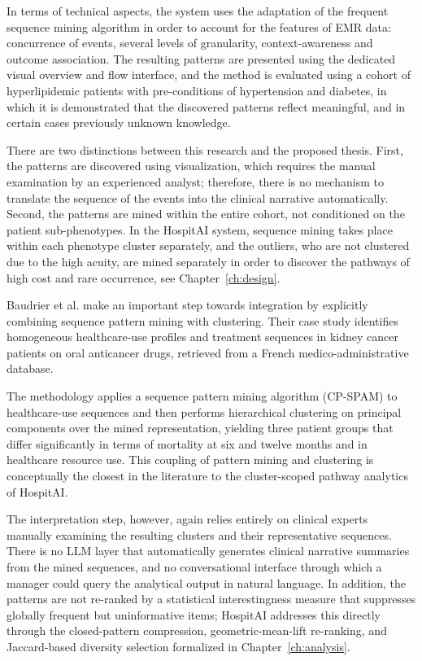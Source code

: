 In terms of technical aspects, the system uses the adaptation of the frequent sequence mining algorithm in order to account for the features of EMR data: concurrence of events, several levels of granularity, context-awareness and outcome association. The resulting patterns are presented using the dedicated visual overview and flow interface, and the method is evaluated using a cohort of hyperlipidemic patients with pre-conditions of hypertension and diabetes, in which it is demonstrated that the discovered patterns reflect meaningful, and in certain cases previously unknown knowledge.

There are two distinctions between this research and the proposed thesis. First, the patterns are discovered using visualization, which requires the manual examination by an experienced analyst; therefore, there is no mechanism to translate the sequence of the events into the clinical narrative automatically. Second, the patterns are mined within the entire cohort, not conditioned on the patient sub-phenotypes. In the HospitAI system, sequence mining takes place within each phenotype cluster separately, and the outliers, who are not clustered due to the high acuity, are mined separately in order to discover the pathways of high cost and rare occurrence, see Chapter~\ref{ch:design}.

Baudrier et al. \cite{baudrier2022} make an important step towards integration by explicitly combining sequence pattern mining with clustering. Their case study identifies homogeneous healthcare-use profiles and treatment sequences in kidney cancer patients on oral anticancer drugs, retrieved from a French medico-administrative database.

The methodology applies a sequence pattern mining algorithm (CP-SPAM) to healthcare-use sequences and then performs hierarchical clustering on principal components over the mined representation, yielding three patient groups that differ significantly in terms of mortality at six and twelve months and in healthcare resource use. This coupling of pattern mining and clustering is conceptually the closest in the literature to the cluster-scoped pathway analytics of HospitAI.

The interpretation step, however, again relies entirely on clinical experts manually examining the resulting clusters and their representative sequences. There is no LLM layer that automatically generates clinical narrative summaries from the mined sequences, and no conversational interface through which a manager could query the analytical output in natural language. In addition, the patterns are not re-ranked by a statistical interestingness measure that suppresses globally frequent but uninformative items; HospitAI addresses this directly through the closed-pattern compression, geometric-mean-lift re-ranking, and Jaccard-based diversity selection formalized in Chapter~\ref{ch:analysis}.

